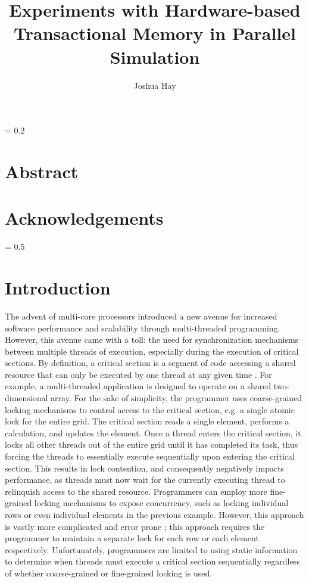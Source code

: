 \documentclass[a4paper]{article}
\title{
    \vspace{2in}
    \textbf{Experiments with Hardware-based Transactional Memory in Parallel
    Simulation \\}
    \vspace{2in}
}
\author{Joshua Hay}
\affil{hayja@mail.uc.edu}
\affil{(513) 607-4929}
\begin{document}
%
\maketitle
\thispagestyle{empty}
\newpage
\thispagestyle{empty}
\parskip = 0.2\baselineskip
\newpage
\thispagestyle{empty}
\section*{\textbf{Abstract}}
\newpage
\thispagestyle{empty}
\section*{\textbf{Acknowledgements}}
\newpage
\thispagestyle{empty}
\tableofcontents
\newpage
\thispagestyle{empty}
\listoffigures
\listoftables
\parskip = 0.5\baselineskip
\newpage

\section{\textbf{Introduction}}

\indent 
The advent of multi-core processors introduced a new avenue for increased
software performance and scalability through multi-threaded programming.
However, this avenue came with a toll: the need for synchronization mechanisms
between multiple threads of execution, especially during the execution of
critical sections.  By definition, a critical section is a segment of code
accessing a shared resource that can only be executed by one thread at any given
time \cite{os_concepts}.  For example, a multi-threaded application is designed
to operate on a shared two-dimensional array.  For the sake of simplicity, the
programmer uses coarse-grained locking mechanisms to control access to the
critical section, e.g. a single atomic lock for the entire grid.  The critical
section reads a single element, performs a calculation, and updates the element.  Once
a thread enters the critical section, it locks all other threads out of the
entire grid until it has completed its task, thus forcing the threads to
essentially execute sequentially upon entering the critical section.  This
results in lock contention, and consequently negatively impacts performance, as
threads must now wait for the currently executing thread to relinquish access to
the shared resource.  Programmers can employ more fine-grained locking
mechanisms to expose concurrency, such as locking individual rows or even
individual elements in the previous example.  However, this approach is vastly more
complicated and error prone \cite{sle_rajwar}; this approach requires the
programmer to maintain a separate lock for each row or each element respectively.
Unfortunately, programmers are limited to using static information to determine
when threads must execute a critical section sequentially regardless of whether
coarse-grained or fine-grained locking is used.
\par
\end{document}
